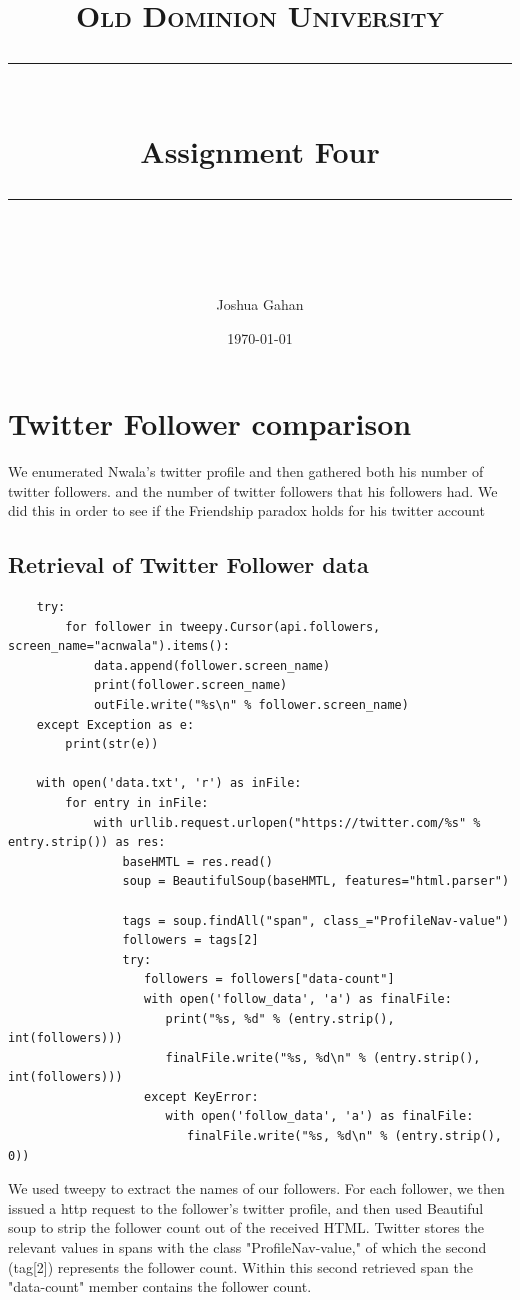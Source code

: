 \documentclass[11pt]{article}
\title{	
	\normalfont\normalsize
	\textsc{Old Dominion University}\\ %
	\vspace{25pt} %
	\rule{\linewidth}{0.5pt}\\ %
	\vspace{20pt} %
	{\huge Assignment Four}\\ %
	\vspace{12pt} %
	\rule{\linewidth}{2pt}\\ %
	\vspace{20pt} %
}
\author{\LARGE Joshua Gahan} %
\date{\normalsize\today} %
\begin{document}
	\maketitle %
	\newpage
	
	\section{Twitter Follower comparison}
	\hspace{10mm} We enumerated Nwala's twitter profile and then gathered both his number of twitter followers. and the number of twitter followers that his followers had. We did this in order to see if the Friendship paradox holds for his twitter account
	\subsection{Retrieval of Twitter Follower data}
	\begin{lstlisting}
	try:
	    for follower in tweepy.Cursor(api.followers, screen_name="acnwala").items():
	        data.append(follower.screen_name)
	        print(follower.screen_name)
	        outFile.write("%s\n" % follower.screen_name)
	except Exception as e:
	    print(str(e))
	
	with open('data.txt', 'r') as inFile:
	    for entry in inFile:
	        with urllib.request.urlopen("https://twitter.com/%s" % entry.strip()) as res:
	            baseHMTL = res.read()
	            soup = BeautifulSoup(baseHMTL, features="html.parser")
	
	            tags = soup.findAll("span", class_="ProfileNav-value")
	            followers = tags[2]
	            try:
	               followers = followers["data-count"]
	               with open('follow_data', 'a') as finalFile:
	                  print("%s, %d" % (entry.strip(), int(followers)))
	                  finalFile.write("%s, %d\n" % (entry.strip(), int(followers)))
	               except KeyError:
	                  with open('follow_data', 'a') as finalFile:
	                     finalFile.write("%s, %d\n" % (entry.strip(), 0))
	\end{lstlisting}
	\hspace{10mm} We used tweepy to extract the names of our followers. For each follower, we then issued a http request to the follower's twitter profile, and then used Beautiful soup to strip the follower count out of the received HTML. Twitter stores the relevant values in spans with the class "ProfileNav-value," of which the second (tag[2]) represents the follower count. Within this second retrieved span the "data-count" member contains the follower count. 
\end{document}
